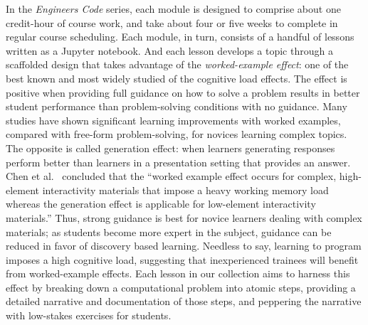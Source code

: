 \documentclass[10pt,journal,compsoc]{IEEEtran}
\begin{document}
In the \emph{Engineers Code} series, each module is designed to comprise about one credit-hour of course work, and take about four or five weeks to complete in regular course scheduling. 
Each module, in turn, consists of a handful of lessons written as a Jupyter notebook. 
And each lesson develops a topic through a scaffolded design that takes advantage of the \emph{worked-example effect}: one of the best known and most widely studied of the cognitive load effects. 
The effect is positive when providing full guidance on how to solve a problem results in better student performance than problem-solving conditions with no guidance. 
Many studies have shown significant learning improvements with worked examples, compared with free-form problem-solving, for novices learning complex topics.
The opposite is called generation effect: 
when learners generating responses perform better than learners in a presentation setting that provides an answer. 
Chen et al.\ \cite{chen2015worked} concluded that the ``worked example effect occurs for complex, high-element interactivity materials that impose a heavy working memory load whereas the generation effect is applicable for low-element interactivity materials.''
Thus, strong guidance is best for novice learners dealing with complex materials; as students become more expert in the subject, guidance can be reduced in favor of discovery based learning. 
Needless to say, learning to program imposes a high cognitive load, suggesting that inexperienced trainees will benefit from worked-example effects. 
Each lesson in our collection aims to harness this effect by breaking down a computational problem into atomic steps, providing a detailed narrative and documentation of those steps, and peppering the narrative with low-stakes exercises for students. 
\end{document}
